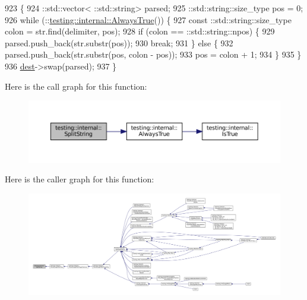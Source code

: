 \begin{DoxyCode}
923                                               \{
924   ::std::vector< ::std::string> parsed;
925   ::std::string::size\_type pos = 0;
926   \textcolor{keywordflow}{while} (::\hyperlink{namespacetesting_1_1internal_a922c9da63cd4bf94fc473b9ecac76414}{testing::internal::AlwaysTrue}()) \{
927     const ::std::string::size\_type colon = str.find(delimiter, pos);
928     \textcolor{keywordflow}{if} (colon == ::std::string::npos) \{
929       parsed.push\_back(str.substr(pos));
930       \textcolor{keywordflow}{break};
931     \} \textcolor{keywordflow}{else} \{
932       parsed.push\_back(str.substr(pos, colon - pos));
933       pos = colon + 1;
934     \}
935   \}
936   \hyperlink{namespaceupload_a770d9c7b49b1fede80de6078d5e49af7}{dest}->swap(parsed);
937 \}
\end{DoxyCode}
Here is the call graph for this function\+:
\nopagebreak
\begin{figure}[H]
\begin{center}
\leavevmode
\includegraphics[width=350pt]{namespacetesting_1_1internal_a8eb8eddf760375a490e007b20777ec56_cgraph}
\end{center}
\end{figure}
Here is the caller graph for this function\+:
\nopagebreak
\begin{figure}[H]
\begin{center}
\leavevmode
\includegraphics[width=350pt]{namespacetesting_1_1internal_a8eb8eddf760375a490e007b20777ec56_icgraph}
\end{center}
\end{figure}
\mbox{\label{namespacetesting_1_1internal_aad4beed95d0846e6ffc5da0978ef3bb9}} 
